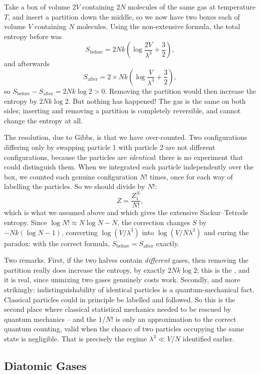 \begin{example}
	Take a box of volume $2V$ containing $2N$ molecules of the same gas at temperature $T$, and insert a partition down the middle, so we now have two boxes each of volume $V$ containing $N$ molecules. Using the non-extensive formula, the total entropy before was
	$$
	S_{\mathrm{before}} = 2Nk\left(\log\frac{2V}{\lambda^3} + \frac 32\right),
	$$
	and afterwards
	$$
	S_{\mathrm{after}} = 2 \times Nk\left(\log\frac{V}{\lambda^3} + \frac 32\right),
	$$
	so $S_{\mathrm{before}} - S_{\mathrm{after}} = 2Nk\log 2 > 0$. Removing the partition would then increase the entropy by $2Nk\log 2$. But nothing has happened! The gas is the same on both sides; inserting and removing a partition is completely reversible, and cannot change the entropy at all.
\end{example}

The resolution, due to Gibbs, is that we have over-counted. Two configurations differing only by swapping particle 1 with particle 2 are not different configurations, because the particles are \emph{identical}: there is no experiment that could distinguish them. When we integrated each particle independently over the box, we counted each genuine configuration $N!$ times, once for each way of labelling the particles. So we should divide by $N!$:
$$
Z = \frac{Z_1^N}{N!},
$$
which is what we assumed above and which gives the extensive Sackur--Tetrode entropy. Since $\log N! \approx N\log N - N$, the correction changes $S$ by $-Nk(\log N - 1)$, converting $\log(V/\lambda^3)$ into $\log(V/N\lambda^3)$ and curing the paradox: with the correct formula, $S_{\mathrm{before}} = S_{\mathrm{after}}$ exactly.

Two remarks. First, if the two halves contain \emph{different} gases, then removing the partition really does increase the entropy, by exactly $2Nk\log 2$; this is the , and it is real, since unmixing two gases genuinely costs work. Secondly, and more strikingly: indistinguishability of identical particles is a quantum-mechanical fact. Classical particles could in principle be labelled and followed. So this is the second place where classical statistical mechanics needed to be rescued by quantum mechanics -- and the $1/N!$ is only an approximation to the correct quantum counting, valid when the chance of two particles occupying the same state is negligible. That is precisely the regime $\lambda^3 \ll V/N$ identified earlier.

\subsection{Diatomic Gases}

